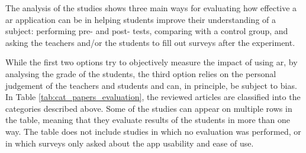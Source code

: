 The analysis of the studies shows three main ways for evaluating how effective a \gls{ar} application can be in helping students improve their understanding of a subject: performing pre- and post- tests, comparing with a control group, and asking the teachers and/or the students to fill out surveys after the experiment.

\begin{figure}[t!]	
	\begin{center}
	
    \captionsetup{font=small}
	\caption{\fontsize{10pt}{11pt}}
	\label{fig:testers}
    \end{center}
\end{figure}

While the first two options try to objectively measure the impact of using \gls{ar}, by analysing the grade of the students, the third option relies on the personal judgement of the teachers and students and can, in principle, be subject to bias.
In Table \ref{tab:cat_papers_evaluation}, the \papersSelected reviewed articles are classified into the categories described above. Some of the studies can appear on multiple rows in the table, meaning that they evaluate results of the students in more than one way. The table does not include studies in which no evaluation was performed, or in which surveys only asked about the app usability and ease of use.

